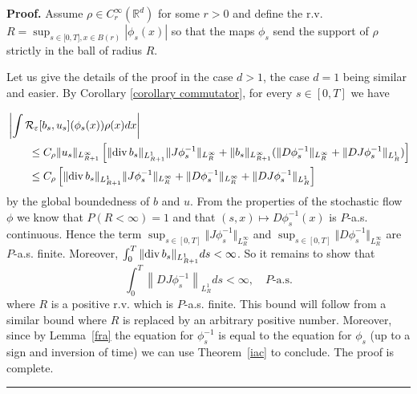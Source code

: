 \documentclass[a4paper,11pt]{article}
\newenvironment{proof}[1][Proof]{\textbf{#1.} }{\ \rule{0.5em}{0.5em}}
\begin{document}
\begin{proof}
Assume $\rho \in C_{r}^{\infty }(\mathbb{R}^{d})$ for some $r>0$ and
define the r.v.
$R=\sup_{s\in \lbrack
0,T],x\in B(r)}|\phi _{s}(x)|$ so that the maps $\phi _{s}$ send the
support of $\rho $ strictly in the ball of radius $R$.

Let us give the details of the proof in the case $d>1$, the case
$d=1$ being
similar and easier. By Corollary \ref{corollary commutator}, for every $s\in %
\left[ 0,T\right] $ we have

\begin{equation*}
\begin{split}
& \left| \int \mathcal{R}_{\varepsilon }[b_{s},u_{s}](\phi
_{s}(x))\rho
(x)dx\right| \\ & \qquad \leq C_{\rho }\Vert u_{s}\Vert _{L_{R+1}^{\infty }}\left[ \Vert {%
\mathrm{div}}\,b_{s}\Vert _{L_{R+1}^{1}}\Vert J\phi _{s}^{-1}\Vert
_{L_{R}^{\infty }}+\Vert b_{s}\Vert _{L_{R+1}^{\infty }}(\Vert D\phi
_{s}^{-1}\Vert _{L_{R}^{\infty }}+\Vert DJ\phi _{s}^{-1}\Vert _{L_{R}^{1}})%
\right]
\\ &\qquad  \leq C_{\rho }\left[ \Vert {\mathrm{div}}\,b_{s}\Vert
_{L_{R+1}^{1}}\Vert J\phi _{s}^{-1}\Vert _{L_{R}^{\infty }}+\Vert
D\phi _{s}^{-1}\Vert _{L_{R}^{\infty }}+\Vert DJ\phi _{s}^{-1}\Vert
_{L_{R}^{1}}\right]
\end{split}
\end{equation*}
by the global boundedness of $b$ and $u$. From the properties of the
stochastic flow ${\phi }$ we know that $P(R<\infty )=1$ and that $%
(s,x)\mapsto D{\phi }_{s}^{-1}(x)$ is $P$-a.s. continuous. Hence the term $%
\sup_{s\in \left[ 0,T\right] }\Vert J{\phi }_{s}^{-1}\Vert
_{L_{R}^{\infty }} $ and $\sup_{s\in \left[ 0,T\right] }\Vert D\phi
_{s}^{-1}\Vert
_{L_{R}^{\infty }}$ are $P$-a.s. finite. Moreover, $\int_{0}^{T}\Vert {%
\mathrm{div}\,}b_{s}\Vert _{L_{R+1}^{1}}ds<\infty $. So it remains to
show that
\begin{equation}
\int_{0}^{T}\left\| DJ{\phi }_{s}^{-1}\right\| _{L_{R}^{1}}ds<\infty ,\quad P%
\text{-a.s.}  \label{bound on DJinvX}
\end{equation}
where $R$ is a positive r.v. which is $P$-a.s. finite.
This bound will follow from a similar
bound where $R$ is replaced by an arbitrary positive number.
Moreover, since by Lemma~\ref{fra} the equation for ${\phi
}_{s}^{-1}$ is equal to the equation for ${\phi }_{s} $ (up to a
sign and inversion of time) we can use Theorem~\ref{iac} to
conclude. The proof is complete.
\end{proof}
\end{document}
